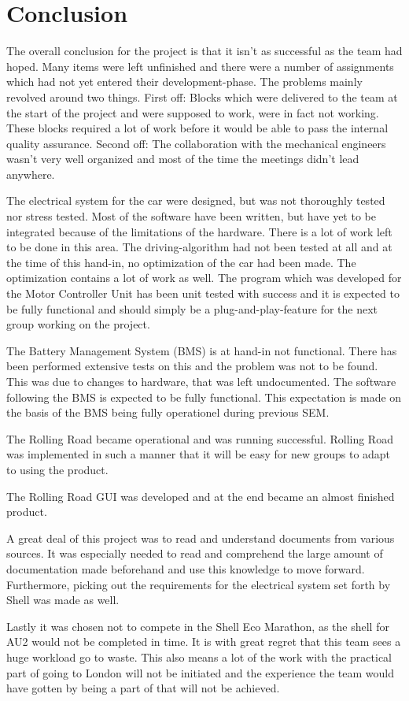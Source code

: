 \chapter{Conclusion}
The overall conclusion for the project is that it isn't as successful as the team had hoped. Many items were left unfinished and there were a number of assignments which had not yet entered their development-phase. The problems mainly revolved around two things. First off: Blocks which were delivered to the team at the start of the project and were supposed to work, were in fact not working. These blocks required a lot of work before it would be able to pass the internal quality assurance. Second off: The collaboration with the mechanical engineers wasn't very well organized and most of the time the meetings didn't lead anywhere.   

The electrical system for the car were designed, but was not thoroughly tested nor stress tested. Most of the software have been written, but have yet to be integrated because of the limitations of the hardware. There is a lot of work left to be done in this area. The driving-algorithm had not been tested at all and at the time of this hand-in, no optimization of the car had been made. The optimization contains a lot of work as well. The program which was developed for the Motor Controller Unit has been unit tested with success and it is expected to be fully functional and should simply be a plug-and-play-feature for the next group working on the project. 

The Battery Management System (BMS) is at hand-in not functional. There has been performed extensive tests on this and the problem was not to be found. This was due to changes to hardware, that was left undocumented. The software following the BMS is expected to be fully functional. This expectation is made on the basis of the BMS being fully operationel during previous SEM.

The Rolling Road became operational and was running successful. Rolling Road was implemented in such a manner that it will be easy for new groups to adapt to using the product. 

The Rolling Road GUI was developed and at the end became an almost finished product.

A great deal of this project was to read and understand documents from various sources. It was especially needed to read and comprehend the large amount of documentation made beforehand and use this knowledge to move forward. Furthermore, picking out the requirements for the electrical system set forth by Shell was made as well.

Lastly it was chosen not to compete in the Shell Eco Marathon, as the shell for AU2 would not be completed in time. It is with great regret that this team sees a huge workload go to waste. This also means a lot of the work with the practical part of going to London will not be initiated and the experience the team would have gotten by being a part of that will not be achieved.
